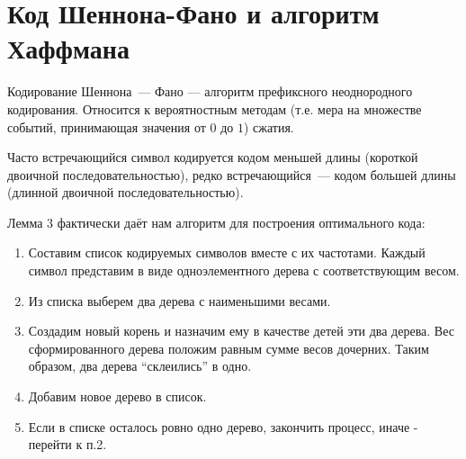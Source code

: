 \section{Код Шеннона-Фано и алгоритм Хаффмана}


Кодирование Шеннона — Фано — алгоритм префиксного неоднородного кодирования. Относится к вероятностным методам (т.е. мера на множестве событий, принимающая значения от $0$ до $1$) сжатия. 


Часто встречающийся символ кодируется кодом меньшей длины (короткой двоичной последовательностью), редко встречающийся — кодом большей длины (длинной двоичной последовательностью).

\begin{algoritm}[Хаффмана]
    Лемма 3 фактически даёт нам алгоритм для построения оптимального кода:
    \begin{enumerate}
        \item Составим список кодируемых символов вместе с их частотами. Каждый символ представим в виде одноэлементного дерева с соответствующим весом.
        \item Из списка выберем два дерева с наименьшими весами.
        \item Создадим новый корень и назначим ему в качестве детей эти два дерева. Вес сформированного дерева положим равным сумме весов дочерних. Таким образом, два дерева “склеились” в одно.
        \item Добавим новое дерево в список.
        \item Если в списке осталось ровно одно дерево, закончить процесс, иначе - перейти к п.2.
    \end{enumerate}
\end{algoritm}


